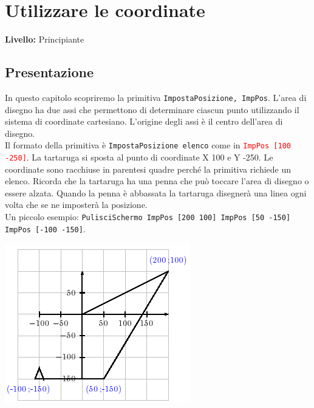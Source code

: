 \chapter{Utilizzare le coordinate}

{ }\hfill\textbf{Livello:} Principiante
\section{Presentazione}
In questo capitolo scopriremo la primitiva \texttt{ImpostaPosizione, ImpPos}. L'area di disegno ha due assi che permettono di determinare ciascun punto utilizzando il sistema di coordinate cartesiano. L'origine degli assi è il centro dell'area di disegno.\\
Il formato della primitiva è \texttt{ImpostaPosizione elenco} come in \textcolor{red}{ \texttt{ImpPos [100 -250]}}. La tartaruga si sposta al punto di coordinate X 100 e Y -250. Le coordinate sono racchiuse in parentesi quadre perché la primitiva richiede un elenco. Ricorda che la tartaruga ha una penna che può toccare l'area di disegno o essere alzata. Quando la penna è abbassata la tartaruga disegnerà una linea ogni volta che se ne imposterà la posizione.\\
Un piccolo esempio: \lstinline!PulisciSchermo ImpPos [200 100] ImpPos [50 -150] ImpPos [-100 -150]!.
\begin{center}
	\includegraphics[scale=0.7]{pics/fpos-coord.png}
\end{center}
\vfill


